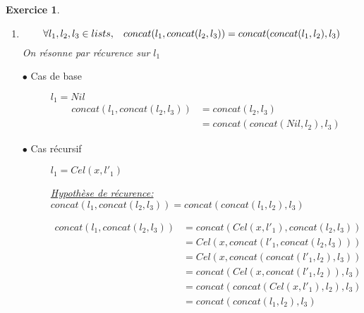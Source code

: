 \documentclass{article}
\theoremstyle{plain}
\newtheorem{exo}{Exercice}%
\begin{document}
\begin{exo}
\begin{enumerate}
\begin{description}
        \begin{align*}
            longueur(concat(Cel(x, l'_1), l_2)) 
                &= longueur(Cel(x, concat(l'_1, l_2))) \\
                &= 1 + longueur(concat(l'_1, l_2)) \\
                &= 1 + longueur(l'_1) + longueur(l_2) \\
                &= longueur(Cel(x, l'_1)) + longueur(l_2) \\
                &= longueur(l_1) + longueur(l_2)
        \end{align*}
    \end{description}
\item
    \begin{equation*}
        \forall l_1, l_2, l_3 \in lists,\hspace{3mm} 
        concat(l_1, concat(l_2, l_3)) = concat(concat(l_1, l_2), l_3) 
    \end{equation*}
    On résonne par récurence sur $l_1$
    \begin{description}
    \item[$\bullet$ Cas de base] $l_1 = Nil$
        \begin{align*} 
            concat(l_1, concat(l_2, l_3)) &= concat(l_2, l_3) \\
                            &= concat(concat(Nil, l_2), l_3) 
        \end{align*}
    \item[$\bullet$ Cas récursif] $l_1 = Cel(x, l'_1)$ 
                
        \underline{Hypothèse de récurence:} $concat(l_1, concat(l_2, l_3)) = 
                                        concat(concat(l_1, l_2), l_3)$
                
        \begin{align*}
            concat(l_1, concat(l_2, l_3)) 
                &= concat(Cel(x, l'_1), concat(l_2, l_3)) \\
                &= Cel(x, concat(l'_1, concat(l_2, l_3))) \\
                &= Cel(x, concat(concat(l'_1, l_2), l_3)) \\
                &= concat(Cel(x, concat(l'_1, l_2)), l_3) \\
                &= concat(concat(Cel(x, l'_1), l_2), l_3) \\
                &= concat(concat(l_1, l_2), l_3) \\
        \end{align*}
    \end{description}
\end{enumerate}
\end{exo}
\end{document}
